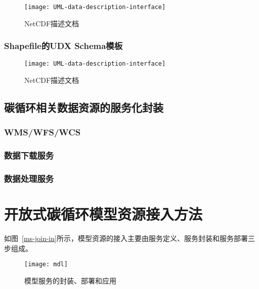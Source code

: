 \begin{figure}[!htbp]
    \centering
    \texttt{[image: UML-data-description-interface]}
    \caption{NetCDF描述文档}
    \label{fig:UML-data-description-interface}
\end{figure}

\subsubsection{Shapefile的UDX Schema模板}

\begin{figure}[!htbp]
    \centering
    \texttt{[image: UML-data-description-interface]}
    \caption{NetCDF描述文档}
    \label{fig:UML-data-description-interface}
\end{figure}

\subsection{碳循环相关数据资源的服务化封装}
\subsubsection{WMS/WFS/WCS}
\subsubsection{数据下载服务}
\subsubsection{数据处理服务}

\section{开放式碳循环模型资源接入方法}
如图~\ref{ms-join-in}所示，模型资源的接入主要由服务定义、服务封装和服务部署三步组成。

\begin{figure}[!htbp]
    \centering
    \texttt{[image: mdl]}
    \caption{模型服务的封装、部署和应用}
    \label{fig:ms-join-in}
\end{figure}


